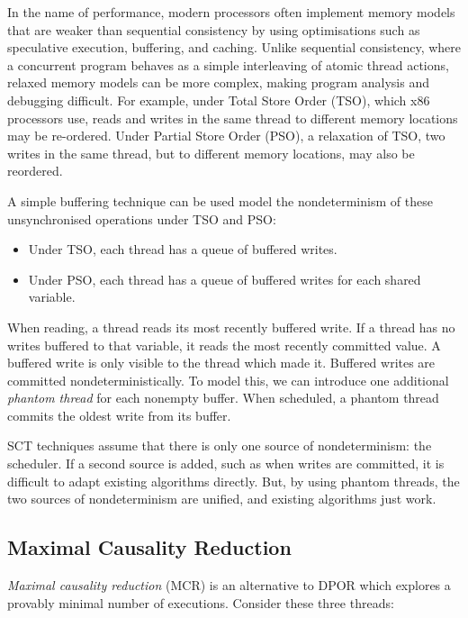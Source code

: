 In the name of performance, modern processors often implement memory
models that are weaker than sequential consistency\cite{lamport1979}
by using optimisations such as speculative execution, buffering, and
caching.  Unlike sequential consistency, where a concurrent program
behaves as a simple interleaving of atomic thread actions, relaxed
memory models can be more complex, making program analysis and
debugging difficult.  For example, under Total Store Order (TSO),
which x86 processors use\cite{owens2009}, reads and writes in the same
thread to different memory locations may be re-ordered.  Under Partial
Store Order (PSO), a relaxation of TSO\cite{sparc}, two writes in the
same thread, but to different memory locations, may also be reordered.

A simple buffering technique can be used model the nondeterminism of
these unsynchronised operations under TSO and PSO\cite{zhang2015}:

\begin{itemize}
\item Under TSO, each thread has a queue of buffered writes.
\item Under PSO, each thread has a queue of buffered writes for each shared
variable.
\end{itemize}

When reading, a thread reads its most recently buffered write.  If a
thread has no writes buffered to that variable, it reads the most
recently committed value.  A buffered write is only visible to the
thread which made it.  Buffered writes are committed
nondeterministically.  To model this, we can introduce one additional
\emph{phantom thread} for each nonempty buffer.  When scheduled, a
phantom thread commits the oldest write from its buffer.

SCT techniques assume that there is only one source of nondeterminism:
the scheduler.  If a second source is added, such as when writes are
committed, it is difficult to adapt existing algorithms directly.
But, by using phantom threads, the two sources of nondeterminism are
unified, and existing algorithms just work\cite{zhang2015}.

\subsection{Maximal Causality Reduction}

\emph{Maximal causality reduction} (MCR)\cite{huang2015,huang2017} is
an alternative to DPOR which explores a provably minimal number of
executions.  Consider these three threads:

